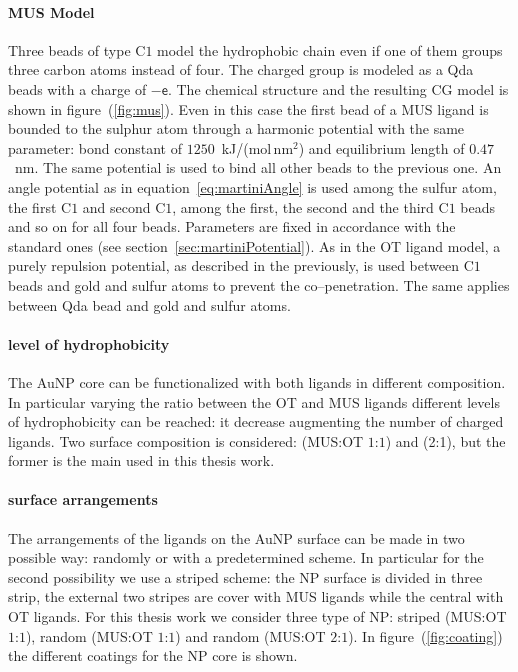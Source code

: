 \paragraph{\textbf{MUS Model}} Three \martini beads of type C$1$ model the hydrophobic chain even if one of them groups three carbon atoms instead of four. The charged group is modeled as a Qda beads with a charge of $-\mathsf{e}$. The chemical structure and the resulting \ac{CG} \martini model is shown in figure~(\ref{fig:mus}). Even in this case the first bead of a \ac{MUS} ligand is bounded to the sulphur atom through a harmonic potential with the same parameter: bond constant of $1250$~kJ/(mol\,nm$^2$) and equilibrium length of $0.47$~nm. The same potential is used to bind all other beads to the previous one. An angle potential as in equation~\eqref{eq:martiniAngle} is used among the sulfur atom, the first C$1$ and second C$1$, among the first, the second and the third C$1$ beads and so on for all four beads. Parameters are fixed in accordance with the standard \martini ones (see section~\ref{sec:martiniPotential}). As in the \ac{OT} ligand model, a purely repulsion potential, as described in the previously, is used between C$1$ beads and gold and sulfur atoms to prevent the co--penetration. The same applies between Qda bead and gold and sulfur atoms.

\paragraph{\textbf{level of hydrophobicity}} The \ac{AuNP} core can be functionalized with both ligands in different composition. In particular varying the ratio between the \ac{OT} and \ac{MUS} ligands different levels of hydrophobicity can be reached: it decrease augmenting the number of charged ligands. Two surface composition is considered: (\ac{MUS}:\ac{OT} $1$:$1$) and (2:1), but the former is the main used in this thesis work.

\paragraph{\textbf{surface arrangements}} The arrangements of the ligands on the \ac{AuNP} surface can be made in two possible way: randomly or with a predetermined scheme. In particular for the second possibility we use a striped scheme: the \ac{NP} surface is divided in three strip, the external two stripes are cover with \ac{MUS} ligands while the central with \ac{OT} ligands. For this thesis work we consider three type of \ac{NP}: striped (\ac{MUS}:\ac{OT} $1$:$1$), random (\ac{MUS}:\ac{OT} $1$:$1$) and random (\ac{MUS}:\ac{OT} $2$:$1$). In figure~(\ref{fig:coating}) the different coatings for the \ac{NP} core is shown.

